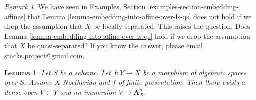 \documentclass{stacks-project}
\theoremstyle{plain}
\newtheorem{lemma}[subsection]{Lemma}
\theoremstyle{definition}
\theoremstyle{remark}
\newtheorem{remark}[subsection]{Remark}
\numberwithin{equation}{subsection}
\begin{document}
\begin{remark}
\label{remark-cannot-embed-in-general}
We have seen in Examples, Section \ref{examples-section-embedding-affines}
that Lemma \ref{lemma-embedding-into-affine-over-ls-qs}
does not hold if we drop the assumption that $X$ be locally separated.
This raises the question: Does
Lemma \ref{lemma-embedding-into-affine-over-ls-qs}
hold if we drop the assumption that $X$ be quasi-separated?
If you know the answer, please email
\href{mailto:stacks.project@gmail.com}{stacks.project@gmail.com}.
\end{remark}

\begin{lemma}
\label{lemma-embedding-into-affine-over-qs}
Let $S$ be a scheme. Let $f : Y \to X$ be a morphism of algebraic
spaces over $S$. Assume $X$ Noetherian and $f$ of finite presentation.
Then there exists a dense open $V \subset Y$ and an immersion
$V \to \mathbf{A}^n_X$.
\end{lemma}
\end{document}
